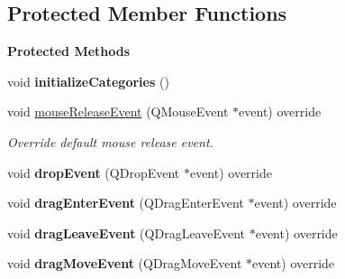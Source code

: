 \subsection*{Protected Member Functions}
\begin{Indent}\textbf{ Protected Methods}\par
\begin{DoxyCompactItemize}
\item 
\mbox{\label{classrev_1_1_view_1_1_resource_tree_widget_af24ca63859481039e2b44aa357d37d45}} 
void {\bfseries initialize\+Categories} ()
\item 
\mbox{\label{classrev_1_1_view_1_1_resource_tree_widget_ac4288d34f59d4e5382771123f779daab}} 
void \mbox{\hyperlink{classrev_1_1_view_1_1_resource_tree_widget_ac4288d34f59d4e5382771123f779daab}{mouse\+Release\+Event}} (Q\+Mouse\+Event $\ast$event) override
\begin{DoxyCompactList}\small\item\em Override default mouse release event. \end{DoxyCompactList}\item 
\mbox{\label{classrev_1_1_view_1_1_resource_tree_widget_adc7dbe5133e9b8859c51d6bd362ee050}} 
void {\bfseries drop\+Event} (Q\+Drop\+Event $\ast$event) override
\item 
\mbox{\label{classrev_1_1_view_1_1_resource_tree_widget_aed106d79962ce1da519d7f09a4b832ba}} 
void {\bfseries drag\+Enter\+Event} (Q\+Drag\+Enter\+Event $\ast$event) override
\item 
\mbox{\label{classrev_1_1_view_1_1_resource_tree_widget_a60e29e10374ebfea3ae93a97bf9d2ee9}} 
void {\bfseries drag\+Leave\+Event} (Q\+Drag\+Leave\+Event $\ast$event) override
\item 
\mbox{\label{classrev_1_1_view_1_1_resource_tree_widget_af1c5ab1d984ba2057cf6b274b5476c95}} 
void {\bfseries drag\+Move\+Event} (Q\+Drag\+Move\+Event $\ast$event) override
\item 
\mbox{\label{classrev_1_1_view_1_1_resource_tree_widget_a7a2a954ca8d729857a65839ce2102483}} 

\end{DoxyCompactItemize}
\end{Indent}
